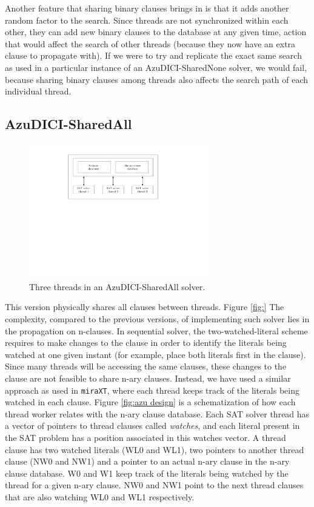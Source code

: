 \documentclass[12pt]{diicc}
\begin{document}
Another feature that sharing binary clauses brings in is that it adds another random factor to the search. Since threads are not synchronized within each other, they can add new binary clauses to the database at any given time, action that would affect the search of other threads (because they now have an extra clause to propagate with). If we were to try and replicate the exact same search as used in a particular instance of an AzuDICI-SharedNone solver, we would fail, because sharing binary clauses among threads also affects the search path of each individual thread.

\subsection{AzuDICI-SharedAll}

\begin{figure}[h!]
	\centering
		\includegraphics[width=0.7\textwidth]{sharedall}
	\caption{Three threads in an AzuDICI-SharedAll solver.}
	\label{fig:azu sharedall}
\end{figure}

This version physically shares all clauses between threads. Figure \ref{fig:} The complexity, compared to the previous versions, of implementing such solver lies in the propagation on n-clauses. In sequential solver, the two-watched-literal
scheme requires to make changes to the clause in order to identify
the literals being watched at one given instant (for example, place
both literals first in the clause). Since many threads will be
accessing the same clauses, these changes to the clause are not
feasible to share n-ary clauses. Instead, we have used a similar 
approach as used in
{\tt miraXT}, where each thread keeps track of the literals being
watched in each clause. Figure \ref{fig:azu design} is a
schematization of how each thread worker relates with the n-ary
clause database. Each SAT solver thread has a vector of pointers
to thread clauses called \textit{watches}, and each literal present
in the SAT problem has a position associated in this watches vector.
A thread clause has two watched literals (WL0 and WL1), two
pointers to another thread clause (NW0 and NW1) and a pointer to
an actual n-ary clause in the n-ary clause database. W0 and W1 keep
track of the literals being watched by the thread for a given n-ary
clause. NW0 and NW1 point to the next thread clauses that are also 
watching WL0 and WL1 respectively.
\end{document}
